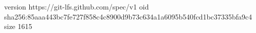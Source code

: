 version https://git-lfs.github.com/spec/v1
oid sha256:85aaa443bc7fe727f858c4c8900d9b73c634a1a6095b540fcd1bc37335bfa9c4
size 1615
